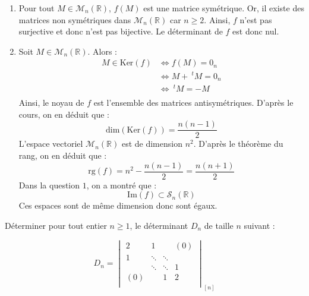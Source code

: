 \documentclass[a4paper,10pt]{report}
\begin{document}
\begin{enumerate}
\item Pour tout $M \in \mathcal{M}_n(\mathbb{R})$, $f(M)$ est une matrice symétrique. Or, il existe des matrices non symétriques dans $\mathcal{M}_n(\mathbb{R})$ car $n \geq 2$. Ainsi, $f$ n'est pas surjective et donc n'est pas bijective. Le déterminant de $f$ est donc nul.
\item Soit $M \in \mathcal{M}_n(\mathbb{R})$. Alors :
\begin{align*}
M \in \textrm{Ker}(f) & \Longleftrightarrow f(M)=0_n \\
& \Longleftrightarrow M+~^tM= 0_n \\
& \Longleftrightarrow ~^tM=-M \\
\end{align*}
Ainsi, le noyau de $f$ est l'ensemble des matrices antisymétriques. D'après le cours, on en déduit que :
$$ \textrm{dim}(\textrm{Ker}(f)) = \dfrac{n(n-1)}{2}$$
L'espace vectoriel $\mathcal{M}_n(\mathbb{R})$ est de dimension $n^2$. D'après le théorème du rang, on en déduit que :
$$ \textrm{rg}(f) = n^2 - \dfrac{n(n-1)}{2} = \dfrac{n(n+1)}{2}$$
Dans la question $1$, on a montré que :
$$ \textrm{Im}(f) \subset \mathcal{S}_n(\mathbb{R})$$
Ces espaces sont de même dimension donc sont égaux.
\end{enumerate}

\begin{Exercice}{} Déterminer pour tout entier $n \geq 1$, le déterminant $D_n$ de taille $n$ suivant :

\[
    D_n =
    \begin{vmatrix}
        2 & 1 & {} & {(0)} \\
        1 & \ddots & \ddots & {} \\
        {} & \ddots & \ddots & 1 \\
        {(0)} & {} & 1 & 2 \\
    \end{vmatrix}_{[n]}
    \]
\end{Exercice} 
\end{document}
